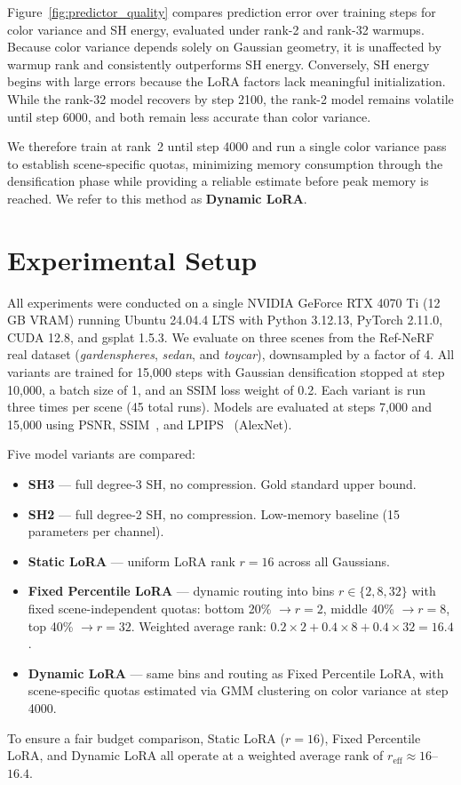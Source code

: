 \documentclass[sigconf]{acmart}
\begin{document}
Figure~\ref{fig:predictor_quality} compares prediction error over training 
steps for color variance and SH energy, evaluated under rank-2 and rank-32 
warmups. Because color variance depends solely on Gaussian geometry, it is 
unaffected by warmup rank and consistently outperforms SH energy. Conversely, 
SH energy begins with large errors because the LoRA factors lack meaningful 
initialization. While the rank-32 model recovers by step 2100, the rank-2 
model remains volatile until step 6000, and both remain less accurate than 
color variance. 

We therefore train at rank~2 until step 4000 and run a single color variance
pass to establish scene-specific quotas, minimizing memory consumption
through the densification phase while providing a reliable estimate before peak
memory is reached. We refer to this method as \textbf{Dynamic LoRA}.

\section{Experimental Setup}
\label{sec:experiments}

All experiments were conducted on a single NVIDIA GeForce RTX 4070 Ti 
(12\,GB VRAM) running Ubuntu 24.04.4 LTS with Python 3.12.13, PyTorch 
2.11.0, CUDA 12.8, and gsplat 1.5.3. We evaluate on three scenes from the 
Ref-NeRF~\cite{refnerf} real dataset (\textit{gardenspheres}, \textit{sedan}, 
and \textit{toycar}), downsampled by a factor of 4. All variants are trained 
for 15,000 steps with Gaussian densification stopped at step 10,000, a batch 
size of 1, and an SSIM loss weight of 0.2. Each variant is run three times 
per scene (45 total runs). Models are evaluated at steps 7,000 and 15,000 
using PSNR, SSIM~\cite{ssim}, and LPIPS~\cite{lpips} (AlexNet).

Five model variants are compared:
\begin{itemize}[noitemsep, topsep=0pt]
  \item \textbf{SH3} --- full degree-3 SH, no compression. Gold standard 
  upper bound.
  \item \textbf{SH2} --- full degree-2 SH, no compression. Low-memory 
  baseline (15 parameters per channel).
  \item \textbf{Static LoRA} --- uniform LoRA rank $r=16$ across all 
  Gaussians.
  \item \textbf{Fixed Percentile LoRA} --- dynamic routing into bins $r \in \{2, 8, 32\}$ 
  with fixed scene-independent quotas: bottom 20\% $\to r=2$, middle 40\% 
  $\to r=8$, top 40\% $\to r=32$. Weighted average rank: 
  $0.2{\times}2 + 0.4{\times}8 + 0.4{\times}32 = 16.4$.
  \item \textbf{Dynamic LoRA} --- same bins and routing as Fixed Percentile LoRA, with 
  scene-specific quotas estimated via GMM clustering on color variance at 
  step 4000.
\end{itemize}
To ensure a fair budget comparison, Static LoRA ($r=16$), Fixed Percentile LoRA, and 
Dynamic LoRA all operate at a weighted average rank of $r_{\text{eff}} 
\approx 16$--$16.4$.
\end{document}
